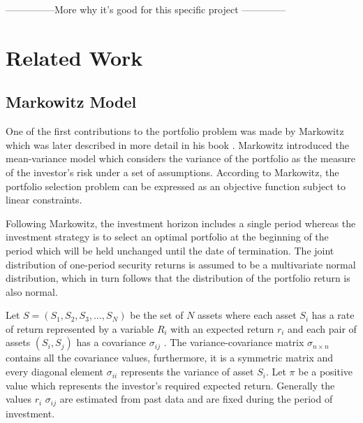 \documentclass{pdfmx4020}
\begin{document}
  ---------------More why it's good for this specific project --------------

    


\chapter{Related Work}
  \section{Markowitz Model} %
  \label{sec:markowitz_model}
    One of the first contributions to the portfolio problem was made by Markowitz \cite{marko1} which was later described in more detail in his book \cite{marko2}. Markowitz introduced the mean-variance model which considers the variance of the portfolio as the measure of the investor's risk under a set of assumptions. According to Markowitz, the portfolio selection problem can be expressed as an objective function subject to linear constraints. 

    Following Markowitz, the investment horizon includes a single period whereas the investment strategy is to select an optimal portfolio at the beginning of the period which will be held unchanged until the date of termination. The joint distribution of one-period security returns is assumed to be a multivariate normal distribution, which in turn follows that the distribution of the portfolio return is also normal. 

    Let $S = (S_1,S_2,S_3, \dots , S_N)$ be the set of $N$ assets where each asset $S_i$ has a rate of return represented by a variable $R_i$ with an expected return $r_i$ and each pair of assets $(S_i,S_j)$ has a covariance $\sigma_{ij}$ . The variance-covariance matrix $\sigma_{n\times n}$ contains all the covariance values, furthermore, it is a symmetric matrix and every diagonal element $\sigma_{ii}$ represents the variance of asset $S_i$. Let $\pi$ be a positive value which represents the investor's required expected return. Generally the values $r_i$ $\sigma_{ij}$ are estimated from past data and are fixed during the period of investment. 
\end{document}
